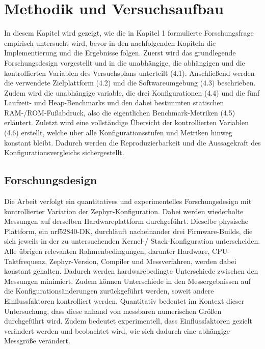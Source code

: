 \chapter{Methodik und Versuchsaufbau}

In diesem Kapitel wird gezeigt, wie die in Kapitel 1 formulierte Forschungsfrage empirisch untersucht wird, bevor in den nachfolgenden Kapiteln die Implementierung und die Ergebnisse folgen. Zuerst wird das grundlegende Forschungsdesign vorgestellt und in die unabh{\"a}ngige, die abh{\"a}ngigen und die kontrollierten Variablen des Versuchsplans unterteilt (4.1). Anschlie{\ss}end werden die verwendete Zielplattform (4.2) und die Softwareumgebung (4.3) beschrieben. Zudem wird die unabh{\"a}ngige variable, die drei Konfigurationen (4.4) und die f{\"u}nf Laufzeit- und Heap-Benchmarks und den dabei bestimmten statischen RAM-/ROM-Fu{\ss}abdruck, also die eigentlichen Benchmark-Metriken (4.5) erl{\"a}utert. Zuletzt wird eine vollst{\"a}ndige {\"U}bersicht der kontrollierten Variablen (4.6) erstellt, welche {\"u}ber alle Konfigurationsstufen und Metriken hinweg konstant bleibt. Dadurch werden die Reproduzierbarkeit und die Aussagekraft des Konfigurationsvergleichs sichergestellt.

\section{Forschungsdesign}
Die Arbeit verfolgt ein quantitatives und experimentelles Forschungsdesign mit kontrollierter Variation der Zephyr-Konfiguration. Dabei werden wiederholte Messungen auf derselben Hardwareplattform durchgef{\"u}hrt. Dieselbe physische Plattform, ein nrf52840-DK, durchl{\"a}uft nacheinander drei Firmware-Builds, die sich jeweils in der zu untersuchenden Kernel-/ Stack-Konfiguration unterscheiden. Alle {\"u}brigen relevanten Rahmenbedingungen, darunter Hardware, CPU-Taktfrequenz, Zephyr-Version, Compiler und Messverfahren, werden dabei konstant gehalten. Dadurch werden hardwarebedingte Unterschiede zwischen den Messungen minimiert. Zudem k{\"o}nnen Unterschiede in den Messergebnissen auf die Konfigurations{\"a}nderungen zur{\"u}ckgef{\"u}hrt werden, soweit andere Einflussfaktoren kontrolliert werden. Quantitativ bedeutet im Kontext dieser Untersuchung, dass diese anhand von messbaren numerischen Gr{\"o}{\ss}en durchgef{\"u}hrt wird. Zudem bedeutet experimentell, dass Einflussfaktoren gezielt ver{\"a}ndert werden und beobachtet wird, wie sich dadurch eine abh{\"a}ngige Messgr{\"o}{\ss}e ver{\"a}ndert.


